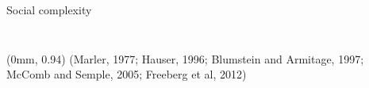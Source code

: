 \documentclass[xcolor=dvipsnames]{beamer}
\newcommand\References[1]{
\tiny{
  \begin{textblock*}{\paperwidth}(0mm, 0.94\paperheight)%
    \raggedleft (#1)\hspace{0.01\paperwidth}
  \end{textblock*}}}
\begin{document}
\begin{frame}{Social complexity}
\begin{overlayarea}{\textwidth}{0.8\paperheight}
\begin{columns}
\begin{column}{0.25\textwidth}
\begin{figure}
\end{figure}
\end{column}
\end{columns}
\end{overlayarea}
\begin{overlayarea}{\textwidth}{0.2\paperheight}
\end{overlayarea}
\References{Marler, 1977; Hauser, 1996; Blumstein and Armitage, 1997; McComb and Semple, 2005; Freeberg et al, 2012}
\end{frame}
\end{document}
